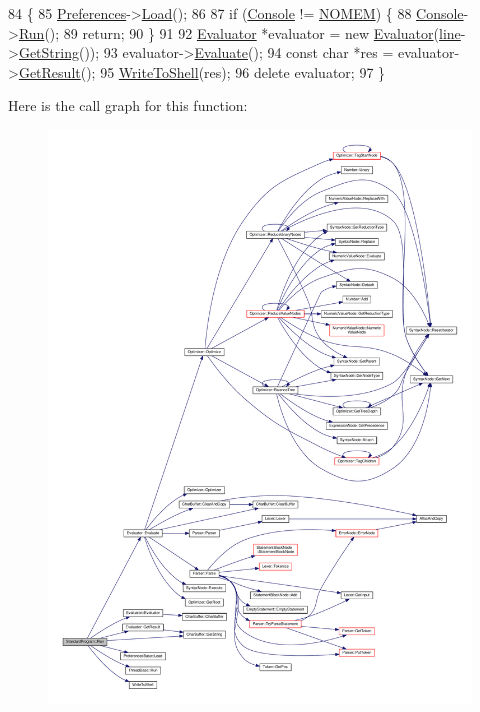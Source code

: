 \begin{DoxyCode}
84 \{
85     \hyperlink{classProgram_ad6baa89972cb4938db341c77c1510793}{Preferences}->\hyperlink{classPreferencesBase_ab4e17e21f4377c44fa0ba16a0868a206}{Load}();
86 
87     \textcolor{keywordflow}{if} (\hyperlink{classProgram_a7edba60e839230f20ce29716567bc892}{Console} != \hyperlink{platform_8h_a46ff2bfbf0d44b8466a2251d5bd5e6f8}{NOMEM}) \{
88         \hyperlink{classProgram_a7edba60e839230f20ce29716567bc892}{Console}->\hyperlink{classThreadBase_a795d258c1f40c123859d0e83dce6a0ad}{Run}();
89         \textcolor{keywordflow}{return};
90     \}
91 
92     \hyperlink{classEvaluator}{Evaluator} *evaluator = \textcolor{keyword}{new} \hyperlink{classEvaluator}{Evaluator}(\hyperlink{classStandardProgram_aba785a89c947a8a2c42aec60e98bd9cd}{line}->\hyperlink{classCharBuffer_a7dfd3feaaf80f318ba44efe15b1ec44b}{GetString}());
93     evaluator->\hyperlink{classEvaluator_a40b30ece9d43c658877ee7f52aaec0a8}{Evaluate}();
94     \textcolor{keyword}{const} \textcolor{keywordtype}{char} *res = evaluator->\hyperlink{classEvaluator_abcc678772175bf00127a3b307463ae4b}{GetResult}();
95     \hyperlink{io_8h_afabbf967db247cad6ad9a6f416e99e12}{WriteToShell}(res);
96     \textcolor{keyword}{delete} evaluator;
97 \}
\end{DoxyCode}


Here is the call graph for this function\+:
\nopagebreak
\begin{figure}[H]
\begin{center}
\leavevmode
\includegraphics[width=350pt]{d3/d7b/classStandardProgram_a71dce9fdccf23ac49ba2362dcae744d3_cgraph}
\end{center}
\end{figure}





